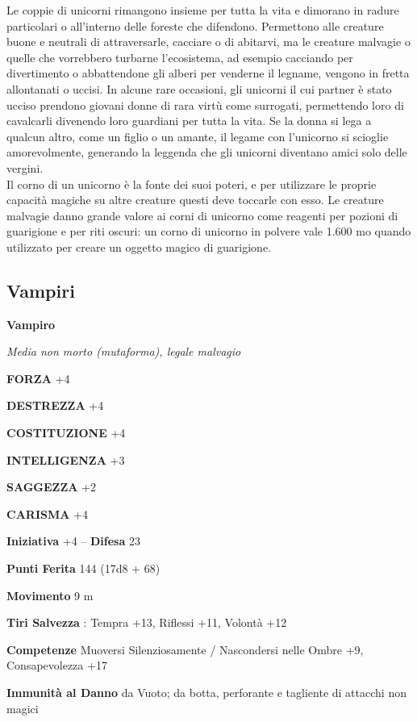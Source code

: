 \begin{multicols}{2}
Le coppie di unicorni rimangono insieme per tutta la vita e dimorano in radure particolari o all'interno delle foreste che difendono. Permettono alle creature buone e neutrali di attraversarle, cacciare o di abitarvi, ma le creature malvagie o quelle che vorrebbero turbarne l'ecosistema, ad esempio cacciando per divertimento o abbattendone gli alberi per venderne il legname, vengono in fretta allontanati o uccisi. In alcune rare occasioni, gli unicorni il cui partner è stato ucciso prendono giovani donne di rara virtù come surrogati, permettendo loro di cavalcarli divenendo loro guardiani per tutta la vita. Se la donna si lega a qualcun altro, come un figlio o un amante, il legame con l'unicorno si scioglie amorevolmente, generando la leggenda che gli unicorni diventano amici solo delle vergini.\\

Il corno di un unicorno è la fonte dei suoi poteri, e per utilizzare le proprie capacità magiche su altre creature questi deve toccarle con esso. Le creature malvagie danno grande valore ai corni di unicorno come reagenti per pozioni di guarigione e per riti oscuri: un corno di unicorno in polvere vale 1.600 mo quando utilizzato per creare un oggetto magico di guarigione.\\


\subsection{Vampiri}

\medskip{}\textbf{Vampiro}

\emph{Media non morto (mutaforma), legale malvagio}

\textbf{FORZA} +4

\textbf{DESTREZZA} +4

\textbf{COSTITUZIONE} +4

\textbf{INTELLIGENZA} +3

\textbf{SAGGEZZA} +2

\textbf{CARISMA} +4

\textbf{Iniziativa} +4 -- \textbf{Difesa} 23

\textbf{Punti Ferita} 144 (17d8 + 68)

\textbf{Movimento} 9 m

\textbf{Tiri Salvezza} : Tempra +13, Riflessi +11, Volontà +12

\textbf{Competenze} Muoversi Silenziosamente / Nascondersi nelle Ombre +9, Consapevolezza +17

\textbf{Immunità al Danno} da Vuoto; da botta, perforante e tagliente di attacchi non magici


\end{multicols}
